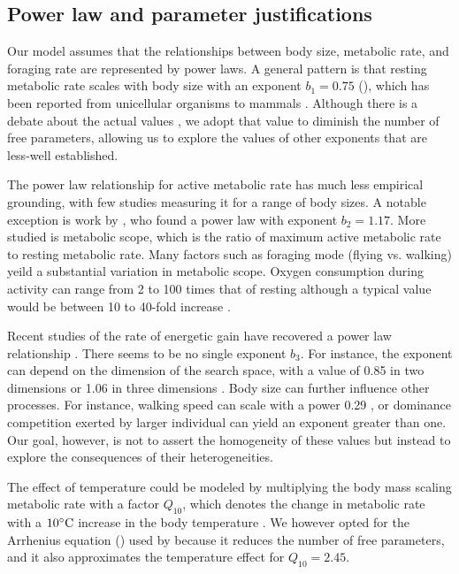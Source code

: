 \subsection*{Power law and parameter justifications}

Our model assumes that the relationships between body size, metabolic rate, and foraging rate are represented by power laws.
A general pattern is that resting metabolic rate scales with body size with an exponent $b_1 = 0.75$ (), which has been reported from unicellular organisms to mammals \citep{Kleiber1947, Peters1986,Gillooly2001,Brown2004}.
Although there is a debate about the actual values \citep[e.g.,][]{Isaac2010}, we adopt that value to diminish the number of free parameters, allowing us to explore the values of other exponents that are less-well established.

The power law relationship for active metabolic rate has much less empirical grounding, with few studies measuring it for a range of body sizes.
A notable exception is work by \citet{Bartholomew1978}, who found a power law with exponent $b_2 = 1.17$.
More studied is metabolic scope, which is the ratio of maximum active metabolic rate to resting metabolic rate.
Many factors such as foraging mode (flying vs. walking) yeild a substantial variation in metabolic scope.
Oxygen consumption during activity can range from 2 to 100 times that of resting \citep{Bartholomew1978, Bartholomew1981, Bartholomew1985, Chown2004, Niitepold2010} although a typical value would be between 10 to 40-fold increase \citep{Bartholomew1981, Niitepold2010}. %

Recent studies of the rate of energetic gain have recovered a power law relationship \citep{Pawar2012, Maino2015}.
There seems to be no single exponent $b_3$.
For instance, the exponent can depend on the dimension of the search space, with a value of 0.85 in two dimensions or 1.06 in three dimensions \citep{Pawar2012}.
Body size can further influence other processes.
For instance, walking speed  can scale with a power 0.29 \citep{Peters1986}, or dominance competition exerted by larger individual can yield an exponent greater than one.
Our goal, however, is not to assert the homogeneity of these values but instead to explore the consequences of their heterogeneities.

The effect of temperature could be modeled by multiplying the body mass scaling metabolic rate with a factor $Q_{10}$, which denotes the change in metabolic rate with a $10^ {\circ} \rm{C}$ increase in the body temperature \citep{Precht1973}.
We however opted for the Arrhenius equation () used by \citet{Brown2004} because it reduces the number of free parameters, and it also approximates the temperature effect for $Q_{10} = 2.45$.

